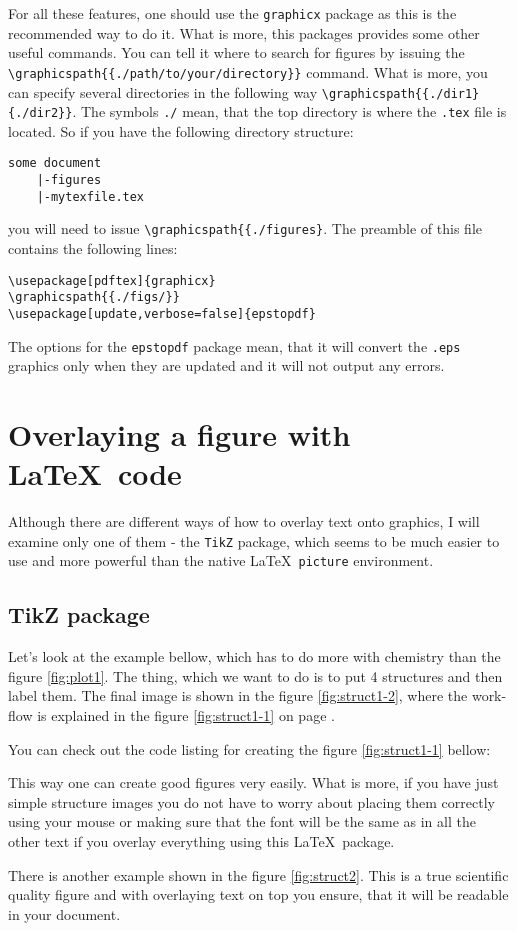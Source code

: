 For all these features, one should use the \verb|graphicx| package as this is
the recommended way to do it. What is more, this packages provides some other
useful commands. You can tell it where to search for figures by issuing the
\lstinline|\graphicspath{{./path/to/your/directory}}| command. What is more, you can
specify several directories in the following way
\lstinline|\graphicspath{{./dir1}{./dir2}}|. The symbols \verb|./| mean, that the top
directory is where the \verb|.tex| file is located. So if you have the following
directory structure:
\begin{lstlisting}
some document
    |-figures
    |-mytexfile.tex
\end{lstlisting}
you will need to issue \verb|\graphicspath{{./figures}|. The preamble of this
file contains the following lines:
\begin{lstlisting}
\usepackage[pdftex]{graphicx}
\graphicspath{{./figs/}}
\usepackage[update,verbose=false]{epstopdf}
\end{lstlisting}

The options for the \verb|epstopdf| package mean, that it will convert the
\verb|.eps| graphics only when they are updated and it will not output any
errors.

\section{Overlaying a figure with \LaTeX\ code}

Although there are different ways of how to overlay text onto graphics, I will
examine only one of them - the \verb|TikZ| package, which seems to be much
easier to use and more powerful than the native \LaTeX\ \verb|picture|
environment.

\subsection{TikZ package}

Let's look at the example bellow, which has to do more with chemistry than the
figure \ref{fig:plot1}. The thing, which we want to do is to put 4 structures
and then label them. The final image is shown in the figure \ref{fig:struct1-2},
where the work-flow is explained in the figure \ref{fig:struct1-1} on page
\pageref{fig:struct1-1}.




You can check out the code listing for creating the figure \ref{fig:struct1-1}
bellow:


This way one can create good figures very easily. What is more, if you have just
simple structure images you do not have to worry about placing them correctly
using your mouse or making sure that the font will be the same as in all the
other text if you overlay everything using this \LaTeX\ package.

There is another example shown in the figure \ref{fig:struct2}. This is a true
scientific quality figure and with overlaying text on top you ensure, that it
will be readable in your document.




